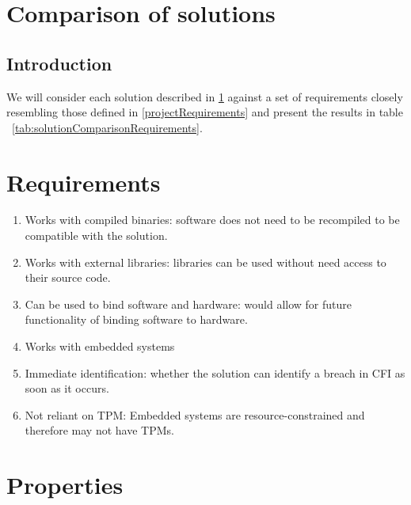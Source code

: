 \section{Comparison of solutions} \label{comparisonOfCFISolutions}

\subsection{Introduction}\label{requirementsIntro}

We will consider each solution described in \ref{comparisonOfCFISolutions} against a set of requirements closely resembling those defined in \ref{projectRequirements} and present the results in table ~\ref{tab:solutionComparisonRequirements}.

\section{Requirements}\label{Requirements}

\begin{enumerate}
	\item Works with compiled binaries: software does not need to be recompiled to be compatible with the solution.
	\item Works with external libraries: libraries can be used without need access to their source code.
	\item Can be used to bind software and hardware: would allow for future functionality of binding software to hardware.
	\item Works with embedded systems
	\item Immediate identification: whether the solution can identify a breach in CFI as soon as it occurs.
	\item Not reliant on TPM: Embedded systems are resource-constrained and therefore may not have TPMs.
\end{enumerate}

\section{Properties}\label{Properties}


